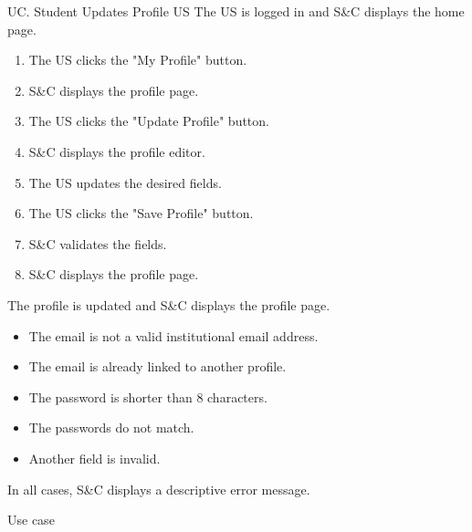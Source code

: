 \clearpage
\begin{usecase}
    {UC\theuc. Student Updates Profile}
    {US}
    {The US is logged in and S\&C displays the home page.}
    {\begin{enumerate}[leftmargin=*]
        \item The US clicks the "My Profile" button.
        \item S\&C displays the profile page.
        \item The US clicks the "Update Profile" button.
        \item S\&C displays the profile editor.
        \item The US updates the desired fields.
        \item The US clicks the "Save Profile" button.
        \item S\&C validates the fields.
        \item S\&C displays the profile page.
    \end{enumerate}}
    {The profile is updated and S\&C displays the profile page.}
    {\begin{itemize}[leftmargin=*, label=\tiny\textbullet]
        \item The email is not a valid institutional email address.
        \item The email is already linked to another profile.
        \item The password is shorter than 8 characters.
        \item The passwords do not match.
        \item Another field is invalid.
    \end{itemize}
    In all cases, S\&C displays a descriptive error message.}
    {Use case \theuc}
\end{usecase}

